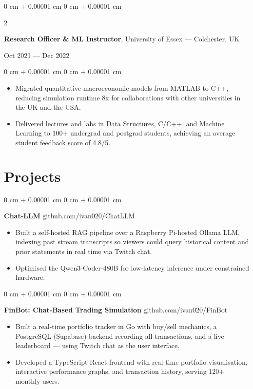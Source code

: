 \documentclass[6pt, letterpaper]{article}
\newenvironment{highlights}{
    \begin{itemize}[
        topsep=0.03 cm,
        parsep=0.03 cm,
        partopsep=0pt,
        itemsep=0pt,
        leftmargin=0 cm + 10pt
    ]
}{
    \end{itemize}
} %
\newenvironment{onecolentry}{
    \begin{adjustwidth}{
        0 cm + 0.00001 cm
    }{
        0 cm + 0.00001 cm
    }
}{
    \end{adjustwidth}
} %
\newenvironment{twocolentry}[2][]{
    \onecolentry
    \def\secondColumn{#2}
    \setcolumnwidth{\fill, 4.5 cm}
    \begin{paracol}{2}
}{
    \switchcolumn \raggedleft \secondColumn
    \end{paracol}
    \endonecolentry
} %
\begin{document}
        \begin{twocolentry}{Oct 2021 --- Dec 2022}
        \textbf{Research Officer \& ML Instructor}, University of Essex --- Colchester, UK
        \end{twocolentry}

        \begin{onecolentry}
        \begin{highlights}
        \item Migrated quantitative macroeconomic models from MATLAB to C++, reducing simulation runtime 8x for collaborations with other universities in the UK and the USA.
        \item Delivered lectures and labs in Data Structures, C/C++, and Machine Learning to 100+ undergrad and postgrad students, achieving an average student feedback score of 4.8/5.
        \end{highlights}
        \end{onecolentry}


    \section{Projects}

    \begin{onecolentry}
        \textbf{Chat-LLM} \hfill github.com/ivan020/ChatLLM

        \begin{highlights}

            \item Built a self-hosted RAG pipeline over a Raspberry Pi-hosted Ollama LLM, indexing past stream transcripts so viewers could query historical content and prior statements in real time via Twitch chat. 
        \item Optimised the Qwen3-Coder-480B for low-latency inference under constrained hardware.

        \end{highlights}
    \end{onecolentry}

    \begin{onecolentry}
        \textbf{FinBot: Chat-Based Trading Simulation} \hfill github.com/ivan020/FinBot

        \begin{highlights}

            \item Built a real-time portfolio tracker in Go with buy/sell mechanics, a PostgreSQL (Supabase) backend recording all transactions, and a live leaderboard — using Twitch chat as the user interface.
            \item Developed a TypeScript React frontend with real-time portfolio visualisation, interactive performance graphs, and transaction history, serving 120+ monthly users.

        \end{highlights}
    \end{onecolentry}
\end{document}
